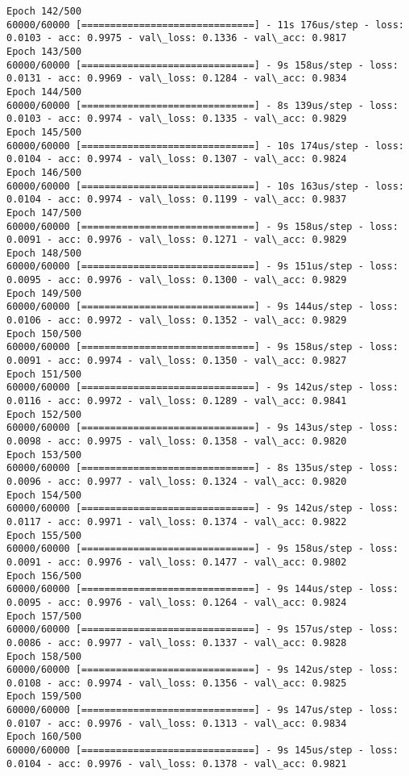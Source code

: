 \documentclass[11pt]{article}
\begin{document}
\begin{Verbatim}[commandchars=\\\{\}]
Epoch 142/500
60000/60000 [==============================] - 11s 176us/step - loss: 0.0103 - acc: 0.9975 - val\_loss: 0.1336 - val\_acc: 0.9817
Epoch 143/500
60000/60000 [==============================] - 9s 158us/step - loss: 0.0131 - acc: 0.9969 - val\_loss: 0.1284 - val\_acc: 0.9834
Epoch 144/500
60000/60000 [==============================] - 8s 139us/step - loss: 0.0103 - acc: 0.9974 - val\_loss: 0.1335 - val\_acc: 0.9829
Epoch 145/500
60000/60000 [==============================] - 10s 174us/step - loss: 0.0104 - acc: 0.9974 - val\_loss: 0.1307 - val\_acc: 0.9824
Epoch 146/500
60000/60000 [==============================] - 10s 163us/step - loss: 0.0104 - acc: 0.9974 - val\_loss: 0.1199 - val\_acc: 0.9837
Epoch 147/500
60000/60000 [==============================] - 9s 158us/step - loss: 0.0091 - acc: 0.9976 - val\_loss: 0.1271 - val\_acc: 0.9829
Epoch 148/500
60000/60000 [==============================] - 9s 151us/step - loss: 0.0095 - acc: 0.9976 - val\_loss: 0.1300 - val\_acc: 0.9829
Epoch 149/500
60000/60000 [==============================] - 9s 144us/step - loss: 0.0106 - acc: 0.9972 - val\_loss: 0.1352 - val\_acc: 0.9829
Epoch 150/500
60000/60000 [==============================] - 9s 158us/step - loss: 0.0091 - acc: 0.9974 - val\_loss: 0.1350 - val\_acc: 0.9827
Epoch 151/500
60000/60000 [==============================] - 9s 142us/step - loss: 0.0116 - acc: 0.9972 - val\_loss: 0.1289 - val\_acc: 0.9841
Epoch 152/500
60000/60000 [==============================] - 9s 143us/step - loss: 0.0098 - acc: 0.9975 - val\_loss: 0.1358 - val\_acc: 0.9820
Epoch 153/500
60000/60000 [==============================] - 8s 135us/step - loss: 0.0096 - acc: 0.9977 - val\_loss: 0.1324 - val\_acc: 0.9820
Epoch 154/500
60000/60000 [==============================] - 9s 142us/step - loss: 0.0117 - acc: 0.9971 - val\_loss: 0.1374 - val\_acc: 0.9822
Epoch 155/500
60000/60000 [==============================] - 9s 158us/step - loss: 0.0091 - acc: 0.9976 - val\_loss: 0.1477 - val\_acc: 0.9802
Epoch 156/500
60000/60000 [==============================] - 9s 144us/step - loss: 0.0095 - acc: 0.9976 - val\_loss: 0.1264 - val\_acc: 0.9824
Epoch 157/500
60000/60000 [==============================] - 9s 157us/step - loss: 0.0086 - acc: 0.9977 - val\_loss: 0.1337 - val\_acc: 0.9828
Epoch 158/500
60000/60000 [==============================] - 9s 142us/step - loss: 0.0108 - acc: 0.9974 - val\_loss: 0.1356 - val\_acc: 0.9825
Epoch 159/500
60000/60000 [==============================] - 9s 147us/step - loss: 0.0107 - acc: 0.9976 - val\_loss: 0.1313 - val\_acc: 0.9834
Epoch 160/500
60000/60000 [==============================] - 9s 145us/step - loss: 0.0104 - acc: 0.9976 - val\_loss: 0.1378 - val\_acc: 0.9821

\end{Verbatim}
\end{document}
